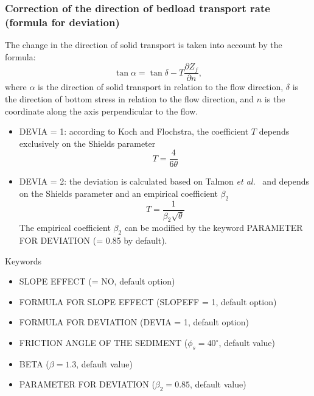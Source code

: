 \begin{itemize}
\subsubsection{Correction of the direction of bedload transport rate (formula for deviation)}
The change in the direction of solid transport is taken into account by the
formula:
\begin{equation}\label{eq:dirsand}
\tan\alpha = \tan\delta -T\frac{\partial Z_f}{\partial n}, 
\end{equation}
where $\alpha$ is the direction of solid transport in relation
to the flow direction, $\delta$ is the direction of bottom stress in relation to the flow
direction, and $n$ is the coordinate along the axis perpendicular to the flow. 
\begin{itemize}
\item {\ttfamily DEVIA = 1}: according to Koch and Flochstra, the coefficient $T$ depends exclusively on the Shields parameter
\begin{equation}\label{eq:DEVIA1}
T=\frac{4}{6\theta} 
\end{equation}
\item {\ttfamily DEVIA = 2}: the deviation is calculated based on Talmon \emph{et al.}~\cite{Talmon} and
depends on the Shields parameter and an empirical coefficient $\beta_2$
\begin{equation}\label{eq:DEVIA2}
T=\frac{1}{\beta_2\sqrt{\theta}} 
\end{equation}
The empirical coefficient $\beta_2$ can be modified by the keyword {\ttfamily PARAMETER FOR DEVIATION} ({\ttfamily = 0.85} by default).
\end{itemize}

\medskip
\begin{bclogo}[couleur=blue!10,arrondi=0.1, logo=\bcinfo]{Keywords}
\begin{itemize}
\item {\ttfamily SLOPE EFFECT} ({\ttfamily = NO}, default option)
\item {\ttfamily FORMULA FOR SLOPE EFFECT} ({\ttfamily SLOPEFF = 1}, default option)
\item {\ttfamily FORMULA FOR DEVIATION} ({\ttfamily DEVIA = 1}, default option)
\item {\ttfamily FRICTION ANGLE OF THE SEDIMENT} ($\phi_s = 40^\circ$, default value) 
\item {\ttfamily BETA} ($\beta = 1.3$, default value)
\item {\ttfamily PARAMETER FOR DEVIATION} ($\beta_2 = 0.85$, default value)
\end{itemize}
\end{bclogo}

\end{itemize}


